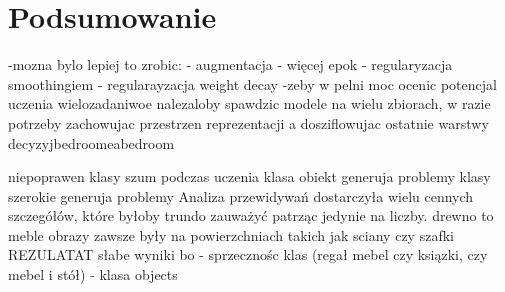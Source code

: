 \newpage %
\section{Podsumowanie}

-mozna bylo lepiej to zrobic:
    - augmentacja
    - więcej epok
    - regularyzacja smoothingiem
    - regularayzacja weight decay
-zeby w pelni moc ocenic potencjal uczenia wielozadaniwoe nalezaloby spawdzic modele na wielu zbiorach, w razie potrzeby zachowujac przestrzen reprezentacji a dosziflowujac ostatnie warstwy decyzyjbedroomeabedroom



niepoprawen klasy szum podczas uczenia
klasa obiekt generuja problemy klasy szerokie generuja problemy
Analiza przewidywań dostarczyła wielu cennych szczegółów, które byłoby trundo zauważyć patrząc jedynie na liczby.
drewno to meble
obrazy zawsze były na powierzchniach takich jak sciany czy szafki
REZULATAT
słabe wyniki bo
- sprzecznośc klas (regał mebel czy ksiązki, czy mebel i stół)
- klasa objects